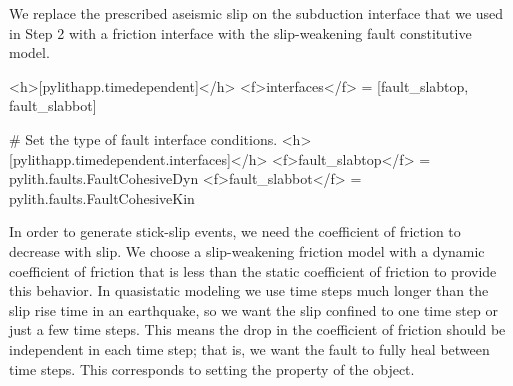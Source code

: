We replace the prescribed aseismic slip
on the subduction interface that we used in Step 2 with a friction interface with the
slip-weakening fault constitutive model. 
\begin{cfg}
<h>[pylithapp.timedependent]</h>
<f>interfaces</f> = [fault_slabtop, fault_slabbot]

# Set the type of fault interface conditions.
<h>[pylithapp.timedependent.interfaces]</h>
<f>fault_slabtop</f> = pylith.faults.FaultCohesiveDyn
<f>fault_slabbot</f> = pylith.faults.FaultCohesiveKin
\end{cfg}

In order to generate stick-slip events, we need the coefficient of
friction to decrease with slip. We choose a slip-weakening friction
model with a dynamic coefficient of friction that is less than the
static coefficient of friction to provide this behavior. In
quasistatic modeling we use time steps much longer than the slip rise
time in an earthquake, so we want the slip confined to one time step
or just a few time steps. This means the drop in the coefficient of
friction should be independent in each time step; that is, we want the
fault to fully heal between time steps. This corresponds to setting
the  property of the 
object.

